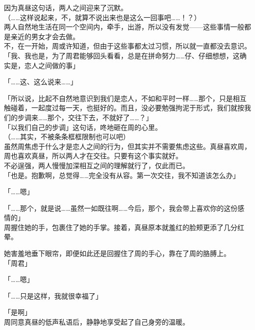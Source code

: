 因为真昼这句话，两人之间迎来了沉默。\\

（……这样说起来，不，就算不说出来也是这么一回事吧……！？）\\

两人自然地生活在同一个空间内，牵手，出游，所以没有发觉——这些事情一般都是亲近的男女才会去做。\\

不，在一开始，周或许知道，但由于这些事都太过习惯，所以就一直都没去意识。\\

「我、我也是，为了周君能够回头看看，总是在拼命努力……仔、仔细想想，这确实是，恋人之间做的事」

「……这、这么说来……」

「所以说，比起不自然地意识到我们是恋人，不如和平时一样……那个，只是相互触碰着，一起度过每一天，也挺好的。而且，没必要勉强拘泥于形式，我们就按我们的步调来……那个，交往下去，不就好了……？」\\

「以我们自己的步调」这句话，咚地砸在周的心里。\\

（……其实，不被条条框框限制也可以吧）\\

虽然周焦虑于什么才是恋人之间的行为，但其实并不需要焦虑这些。真昼喜欢周，周也喜欢真昼，所以两人才在交往。只要有这个事实就好。\\

不必逞强，两人慢慢加深相互之间的理解就行了，仅此而已。\\

「也是。抱歉啊，总觉得……完全没有从容。第一次交往，我不知道该怎么办」

「……嗯」

「……那个，就是说……虽然一如既往啊……今后，那个，我会带上喜欢你的这份感情的」\\

周握住她的手，包裹住了她的手掌。接着，真昼原本就羞红的脸颊更添了几分红晕。

她害羞地垂下眼帘，即便如此还是回握住了周的手心，靠在了周的胳膊上。\\

「周君」

「……嗯」

「……只是这样，我就很幸福了」

「是啊」\\

周同意真昼的低声私语后，静静地享受起了自己身旁的温暖。\\
